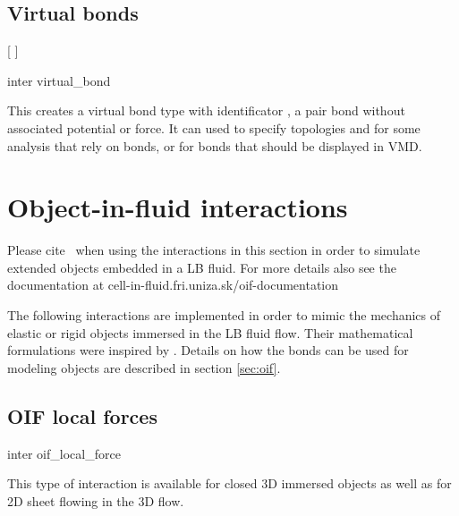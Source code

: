\subsection{Virtual bonds}
\begin{pysyntax}
  [
  ]
\end{pysyntax}
\begin{essyntax}
  inter  virtual_bond
\end{essyntax}

This creates a virtual bond type with identificator , \ie
a pair bond without associated potential or force. It can used to specify
topologies and for some analysis that rely on bonds, or \eg for bonds that
should be displayed in VMD.

\section{Object-in-fluid interactions}
\label{sec:inter-bonded-oif}

\begin{citebox}
  Please cite~ when using the interactions
  in this section in order to simulate extended objects embedded in a
  LB fluid. For more details also see the documentation at cell-in-fluid.fri.uniza.sk/oif-documentation
\end{citebox}

The following interactions are implemented in order to mimic the mechanics of 
elastic or rigid objects immersed in the LB fluid flow. Their mathematical formulations 
were inspired by \cite{dupin07}. Details on how the bonds 
can be used for modeling objects are described in section \ref{sec:oif}.

\subsection{OIF local forces}
\begin{essyntax}
  inter 
  oif_local_force
     \var{\phi}      
     \begin{features}
  \end{features}
\end{essyntax}
This type of interaction is available for closed 3D immersed objects as well as 
for 2D sheet flowing in the 3D flow. 

